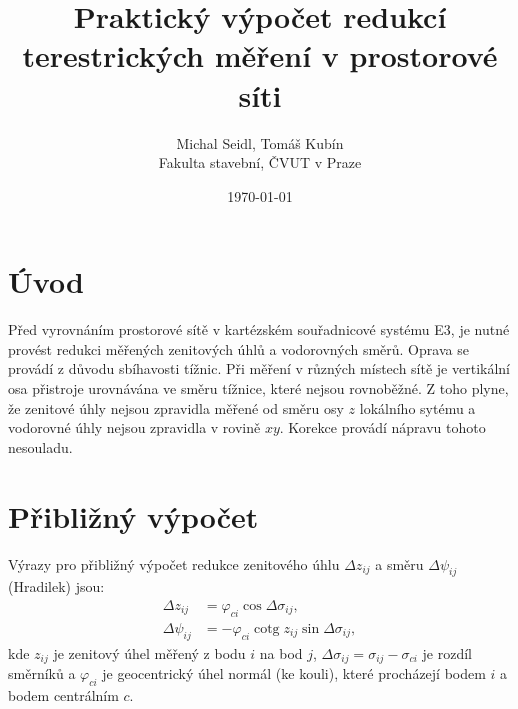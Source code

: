 \documentclass[czech, 12pt]{article}
\DeclareMathOperator{\cotg}{cotg}
\begin{document}

\title{Praktický výpočet redukcí terestrických měření v prostorové síti}
\date{\today}
\author{Michal Seidl, Tomáš Kubín\\Fakulta stavební, ČVUT v Praze}

\maketitle

\tableofcontents

\section{Úvod}
Před vyrovnáním prostorové sítě v kartézském souřadnicové systému E3, je nutné 
provést redukci měřených zenitových úhlů a vodorovných směrů. Oprava se provádí
z důvodu sbíhavosti tížnic. Při měření v různých místech sítě je vertikální osa
přistroje urovnávána ve směru tížnice, které nejsou rovnoběžné. Z toho plyne, že
zenitové úhly nejsou zpravidla měřené od směru osy $z$ lokálního sytému a
vodorovné úhly nejsou zpravidla v rovině $xy$. Korekce provádí nápravu tohoto
nesouladu.

\section{Přibližný výpočet}
Výrazy pro přibližný výpočet redukce zenitového úhlu $\Delta z_{ij}$ a směru
$\Delta\psi_{ij}$ (Hradilek) jsou:
\begin{align*}
\Delta z_{ij} &= \varphi_{ci} \cos \Delta\sigma_{ij},\\
\Delta \psi_{ij} &= - \varphi_{ci} \cotg z_{ij} \sin \Delta\sigma_{ij},
\end{align*}
kde $z_{ij}$ je zenitový úhel měřený z bodu $i$ na bod $j$, $\Delta\sigma_{ij}
=\sigma_{ij} - \sigma_{ci}$ je rozdíl směrníků a $\varphi_{ci}$ je geocentrický
úhel normál (ke kouli), které procházejí bodem $i$ a bodem centrálním $c$. 
\end{document}

